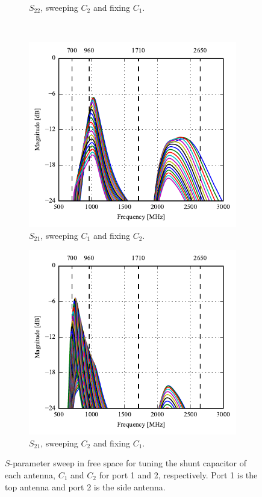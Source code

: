 \begin{figure}[htbp]
\begin{subfigure}[b]{0.49\linewidth}
        \caption{$S_{22}$, sweeping $C_2$ and fixing $C_1$.}
    \end{subfigure}
~
    \begin{subfigure}[b]{0.49\linewidth}
        \centering
        \includegraphics{img/tech_sol/monopole/5mm/sim/sweep_s11_s21}
        \caption{$S_{21}$, sweeping $C_1$ and fixing $C_2$.}
    \end{subfigure}
    \hfill
    \begin{subfigure}[b]{0.49\linewidth}
        \centering
        \includegraphics{img/tech_sol/monopole/5mm/sim/sweep_s22_s21_12p}
        \caption{$S_{21}$, sweeping $C_2$ and fixing $C_1$.}
    \end{subfigure}
    \caption{$S$-parameter sweep in free space for tuning the shunt capacitor of each antenna, $C_1$ and $C_2$ for port 1 and 2, respectively. Port 1 is the top antenna and port 2 is the side antenna.}
    \label{fig:sparam_mono_6pf_free_space}
\end{figure}

